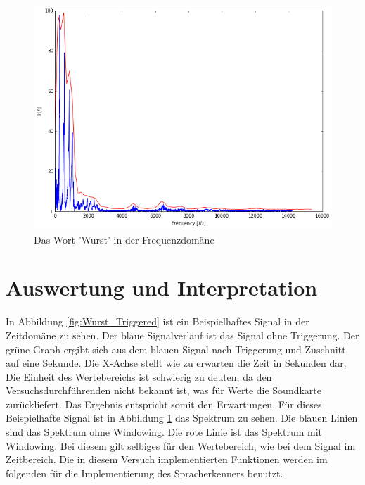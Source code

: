 \begin{figure}[H]
\label{fig:Wurst_Fourier}
\includegraphics[width=\textwidth]{media/Wurst_vgl.png}
\caption{Das Wort 'Wurst' in der Frequenzdomäne}
\end{figure}


\section{Auswertung und Interpretation}
\label{chap:VERSUCH_1_AUSWERTUNG}
In Abbildung \ref{fig:Wurst_Triggered} ist ein Beispielhaftes Signal in der Zeitdomäne zu sehen. Der blaue Signalverlauf ist das Signal ohne Triggerung. Der grüne Graph ergibt sich aus dem blauen Signal nach Triggerung und Zuschnitt auf eine Sekunde. Die X-Achse stellt wie zu erwarten die Zeit in Sekunden dar. Die Einheit des Wertebereichs ist schwierig zu deuten, da den Versuchsdurchführenden nicht bekannt ist, was für Werte die Soundkarte zurückliefert. Das Ergebnis entspricht somit den Erwartungen. Für dieses Beispielhafte Signal ist in Abbildung \ref{fig:Wurst_Fourier} das Spektrum zu sehen. Die blauen Linien sind das Spektrum ohne Windowing. Die rote Linie ist das Spektrum mit Windowing.
Bei diesem gilt selbiges für den Wertebereich, wie bei dem Signal im Zeitbereich. 
Die in diesem Versuch implementierten Funktionen werden im folgenden für die Implementierung des Spracherkenners benutzt.
